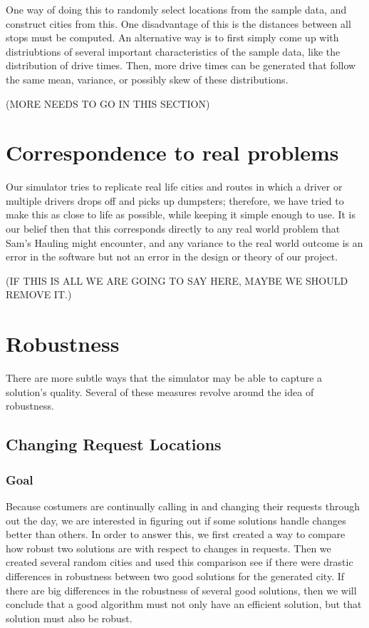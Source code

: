 \documentclass{article}
\begin{document}
One way of doing this to randomly select locations from the sample data, and construct cities from this.
One disadvantage of this is the distances between all stops must be computed.
An alternative way is to first simply come up with distriubtions of several important characteristics of the sample data, like the distribution of drive times.
Then, more drive times can be generated that follow the same mean, variance, or possibly skew of these distributions.


(MORE NEEDS TO GO IN THIS SECTION)

\section{Correspondence to real problems}

Our simulator tries to replicate real life cities and routes in which a driver or multiple drivers drops off and picks up dumpsters;
therefore, we have tried to make this as close to life as possible, while keeping it simple enough to use.
It is our belief then that this corresponds directly to any real world problem that Sam's Hauling might encounter,
and any variance to the real world outcome is an error in the software but not an error in the design or theory of our project.


(IF THIS IS ALL WE ARE GOING TO SAY HERE, MAYBE WE SHOULD REMOVE IT.)

\section{Robustness}

There are more subtle ways that the simulator may be able to capture a solution's quality.
Several of these measures revolve around the idea of robustness.


\subsection{Changing Request Locations}


\subsubsection{Goal}

Because costumers are continually calling in and changing their requests through out the day, we are interested in figuring out if some solutions handle changes better than others.
In order to answer this, we first created a way to compare how robust two solutions are with respect to changes in requests.
Then we created several random cities and used this comparison see if there were drastic differences in robustness between two good solutions for the generated city.
If there are big differences in the robustness of several good solutions, then we will conclude that a good algorithm must not only have an efficient solution, but that solution must also be robust.
\end{document}
